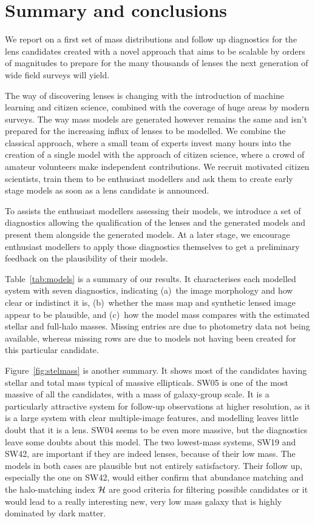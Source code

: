 \section{Summary and conclusions}\label{sec:summary}


We report on a first set of mass distributions and follow up diagnostics for 
the {\SW} lens candidates created with a novel approach that aims to be scalable 
by orders of magnitudes to prepare for the many thousands of lenses the next 
generation of wide field surveys will yield.

The way of discovering lenses is changing with the introduction of machine 
learning and citizen science, combined with the coverage of huge areas by 
modern surveys.
The way mass models are generated however remains the same and isn't prepared 
for the increasing influx of lenses to be modelled.
We combine the classical approach, where a small team of experts invest many 
hours into the creation of a single model with the approach of citizen science, 
where a crowd of amateur volunteers make independent contributions.
We recruit motivated citizen scientists, train them to be enthusiast modellers 
and ask them to create early stage models as soon as a lens candidate is 
announced.

To assists the enthusiast modellers assessing their models, we introduce a set 
of diagnostics allowing the qualification of the lenses and the generated 
models and present them alongside the generated models. At a later stage, we 
encourage enthusiast modellers to apply those diagnostics themselves to get a 
preliminary feedback on the plausibility of their models.

Table~\ref{tab:models} is a summary of our results.  It characterises
each modelled system with seven diagnostics, indicating (a)~the image
morphology and how clear or indistinct it is, (b)~whether the mass map
and synthetic lensed image appear to be plausible, and (c)~how the
model mass compares with the estimated stellar and full-halo masses.
Missing entries are due to photometry data not being available, whereas
missing rows are due to models not having been created for this particular
candidate.

Figure~\ref{fig:stelmass} is another summary.  It shows most of the
candidates having stellar and total mass typical of massive
ellipticals.  SW05 is one of the most massive of all the candidates, with a
mass of galaxy-group scale.  It is a particularly attractive system
for follow-up observations at higher resolution, as it is a large system
with clear multiple-image features, and modelling leaves little doubt
that it is a lens.
SW04 seems to be even more massive, but the diagnostics leave some doubts
about this model.
The two lowest-mass systems, SW19 and SW42, are
important if they are indeed lenses, because of their low mass.
The models in both cases are plausible but not entirely satisfactory.
Their follow up, especially the one on SW42, would either confirm that
abundance matching and the halo-matching index $\mathcal{H}$ are good
criteria for filtering possible candidates or it would lead to a really
interesting new, very low mass galaxy that is highly dominated by dark matter.

